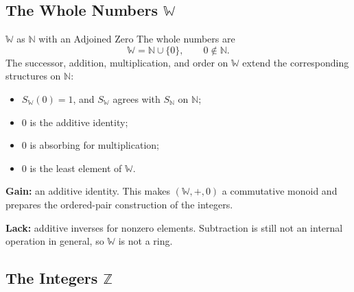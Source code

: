 \subsection*{\texorpdfstring{The Whole Numbers $\mathbb{W}$}{The Whole Numbers W}}

\begin{axiombox}{$\mathbb{W}$ as $\mathbb{N}$ with an Adjoined Zero}
The whole numbers are
\[
\mathbb{W}=\mathbb{N}\cup\{0\},
\qquad 0\notin\mathbb{N}.
\]
The successor, addition, multiplication, and order on $\mathbb{W}$ extend the
corresponding structures on $\mathbb{N}$:
\begin{itemize}
  \item $S_{\mathbb{W}}(0)=1$, and $S_{\mathbb{W}}$ agrees with
        $S_{\mathbb{N}}$ on $\mathbb{N}$;
  \item $0$ is the additive identity;
  \item $0$ is absorbing for multiplication;
  \item $0$ is the least element of $\mathbb{W}$.
\end{itemize}
\end{axiombox}

\begin{remark*}
\textbf{Gain:} an additive identity. This makes
$(\mathbb{W},+,0)$ a commutative monoid and prepares the ordered-pair
construction of the integers.

\textbf{Lack:} additive inverses for nonzero elements. Subtraction is still
not an internal operation in general, so $\mathbb{W}$ is not a ring.
\end{remark*}

\subsection*{\texorpdfstring{The Integers $\mathbb{Z}$}{The Integers Z}}

